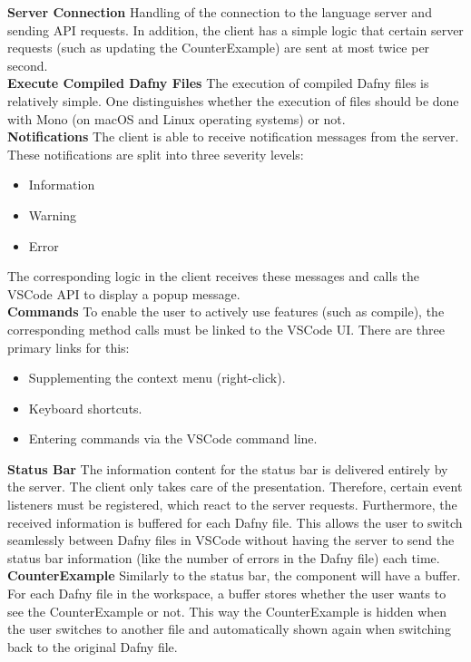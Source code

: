 {\bf Server Connection} \textendash{}
Handling of the connection to the language server and sending API requests.
In addition, the client has a simple logic that certain server requests (such as updating the CounterExample)
are sent at most twice per second. \\

{\bf Execute Compiled Dafny Files} \textendash{}
The execution of compiled Dafny files is relatively simple.
One distinguishes whether the execution of  files should be done with Mono (on macOS and Linux operating systems) or not. \\

{\bf Notifications} \textendash{}
The client is able to receive notification messages from the server.
These notifications are split into three severity levels:
\begin{itemize}
    \item Information
    \item Warning
    \item Error
\end{itemize}
The corresponding logic in the client receives these messages and calls the VSCode API to display a popup message. \\

{\bf Commands} \textendash{}
To enable the user to actively use features (such as compile),
the corresponding method calls must be linked to the VSCode UI.
There are three primary links for this:
\begin{itemize}
    \item Supplementing the context menu (right-click).
    \item Keyboard shortcuts.
    \item Entering commands via the VSCode command line.
\end{itemize}

{\bf Status Bar} \textendash{}
The information content for the status bar is delivered entirely by the server.
The client only takes care of the presentation.
Therefore, certain event listeners must be registered, which react to the server requests.
Furthermore, the received information is buffered for each Dafny file.
This allows the user to switch seamlessly between Dafny files in VSCode
without having the server to send the status bar information
(like the number of errors in the Dafny file) each time.\\

{\bf CounterExample} \textendash{}
Similarly to the status bar, the  component will have a buffer.
For each Dafny file in the workspace, a buffer stores whether the user wants to see the CounterExample or not.
This way the CounterExample is hidden when the user switches to another file
and automatically shown again when switching back to the original Dafny file.

